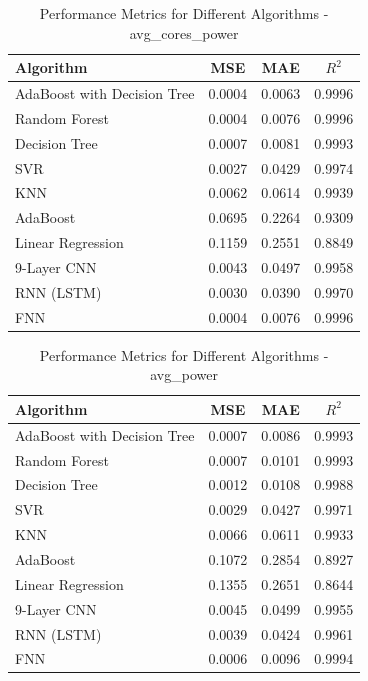 \documentclass[conference]{IEEEtran}
\begin{document}
\begin{table}[htbp]
	\caption{Performance Metrics for Different Algorithms - avg\_cores\_power}
	\label{tab:avg_cores_power}
	\begin{tabular}{lccc}
		\toprule
		\textbf{Algorithm} & \textbf{MSE} & \textbf{MAE} & \textbf{\(R^2\)} \\
		\midrule
		AdaBoost with Decision Tree & 0.0004 & 0.0063 & 0.9996 \\
		Random Forest & 0.0004 & 0.0076 & 0.9996 \\
		Decision Tree & 0.0007 & 0.0081 & 0.9993 \\
		SVR & 0.0027 & 0.0429 & 0.9974 \\
		KNN & 0.0062 & 0.0614 & 0.9939 \\
		AdaBoost & 0.0695 & 0.2264 & 0.9309 \\
		Linear Regression & 0.1159 & 0.2551 & 0.8849 \\
		9-Layer CNN                & 0.0043       & 0.0497       & 0.9958      \\ 
		RNN (LSTM)  & 0.0030       & 0.0390       & 0.9970      \\ 
		FNN                & 0.0004       & 0.0076       & 0.9996      \\ 
		\bottomrule
	\end{tabular}
\end{table}


\begin{table}[htbp]
	\caption{Performance Metrics for Different Algorithms - avg\_power}
	\label{tab:avg_power}
	\begin{tabular}{lccc}
		\toprule
		\textbf{Algorithm} & \textbf{MSE} & \textbf{MAE} & \textbf{\(R^2\)} \\
		\midrule
		AdaBoost with Decision Tree & 0.0007 & 0.0086 & 0.9993 \\
		Random Forest & 0.0007 & 0.0101 & 0.9993 \\
		Decision Tree & 0.0012 & 0.0108 & 0.9988 \\
		SVR & 0.0029 & 0.0427 & 0.9971 \\
		KNN & 0.0066 & 0.0611 & 0.9933 \\
		AdaBoost & 0.1072 & 0.2854 & 0.8927 \\
		Linear Regression & 0.1355 & 0.2651 & 0.8644 \\
		9-Layer CNN                & 0.0045       & 0.0499       & 0.9955      \\ 
		RNN (LSTM)  & 0.0039       & 0.0424       & 0.9961      \\ 
		FNN                & 0.0006       & 0.0096       & 0.9994      \\ 
		\bottomrule
	\end{tabular}
\end{table}
\end{document}

